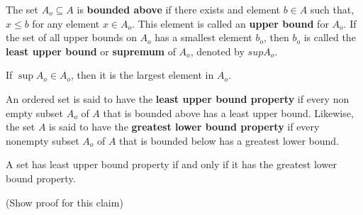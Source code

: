 \documentclass[a4paper,english,12pt]{article}
\begin{document}
\begin{defn}
The set $A_{o} \subseteq A$ is \textbf{bounded above} if there exists and element $b \in A$ such that, $x \le b$ for any element $x \in A_{o}$. This element is called an \textbf{upper bound} for $A_{o}$. If the set of all upper bounds on $A_{o}$ has a smallest element $b_{o}$, then $b_{o}$ is called the \textbf{least upper bound} or \textbf{supremum} of $A_{o}$, denoted by $sup A_{o}$.  

If $\sup A_{o} \in A_{o}$, then it is the largest element in $A_{o}$.
\end{defn}

\begin{defn}
An ordered set is said to have the \textbf{least upper bound property} if every non empty subset $A_{o}$ of $A$ that is bounded above has a least upper bound. Likewise, the set $A$ is said to have the \textbf{greatest lower bound property} if every nonempty subset $A_{o}$ of $A$ that is bounded below has a greatest lower bound. 
\end{defn}

\begin{rem} A set has least upper bound property if and only if it has the greatest lower bound property. 
\end{rem}(Show proof for this claim)
\end{document}
